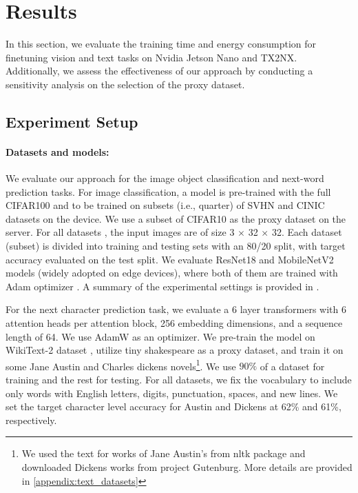 \section{Results}
\label{sec:results}
In this section, we evaluate the training time and energy consumption for finetuning vision and text tasks on Nvidia Jetson Nano and TX2NX. Additionally, we assess the effectiveness of our approach by conducting a sensitivity analysis on the selection of the proxy dataset.

\subsection{Experiment Setup}

\paragraph{Datasets and models:}
We evaluate our approach for the image object classification and next-word prediction tasks. For image classification, a model is pre-trained with the full CIFAR100 \cite{cifars_cite} and to be trained on subsets (i.e., quarter) of SVHN \cite{SVHN_cite} and CINIC \cite{cinic_cite} datasets on the device. We use a subset of CIFAR10 \cite{cifars_cite} as the proxy dataset on the server. For all datasets%
, the input images are of size 3 $\times$ 32 $\times$ 32. Each dataset (subset) is divided into training and testing sets with an 80/20 split, with target accuracy evaluated on the test split. We evaluate ResNet18 \cite{resnet_cite} and MobileNetV2 \cite{mobilenet_cite} models (widely adopted on edge devices), where both of them are trained with Adam optimizer \cite{adam_cite}. A summary of the experimental settings is provided in .

For the next character prediction task, we evaluate a 6 layer transformers with 6 attention heads per attention block, 256 embedding dimensions, and a sequence length of 64. We use AdamW \cite{Adamw_cite} as an optimizer. We pre-train the model on WikiText-2 dataset \cite{wiki_text_cite}, utilize tiny shakespeare \cite{tiny_shakespeare} as a proxy dataset, and train it on some Jane Austin and Charles dickens novels\footnote{We used the text for works of Jane Austin's from nltk package \cite{nltk_library_cite} and downloaded Dickens works from project Gutenburg. More details are provided in \cref{appendix:text_datasets}}. We use $90\%$ of a dataset for training and the rest for testing.  For all datasets, we fix the vocabulary to include only words with English letters, digits, punctuation, spaces, and new lines. We set the target character level accuracy for Austin and Dickens at 62\% and 61\%, respectively. 

